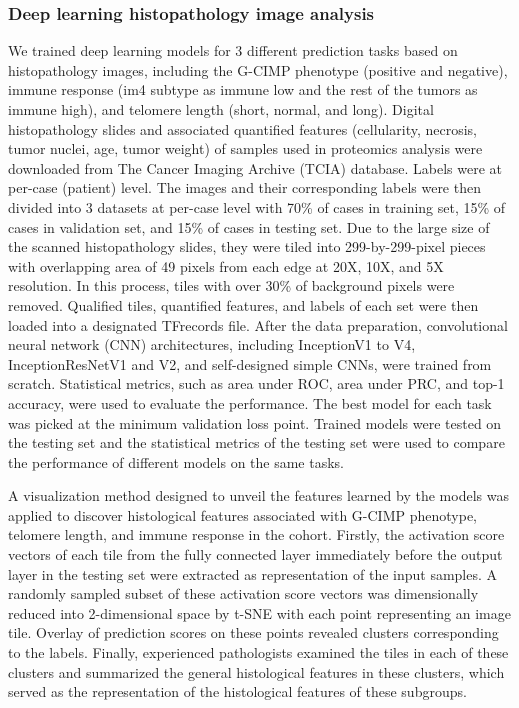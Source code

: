 \subsubsection{Deep learning histopathology image analysis}
We trained deep learning models for 3 different prediction tasks based on histopathology images, including the G-CIMP phenotype (positive and negative), immune response (im4 subtype as immune low and the rest of the tumors as immune high), and telomere length (short, normal, and long). Digital histopathology slides and associated quantified features (cellularity, necrosis, tumor nuclei, age, tumor weight) of samples used in proteomics analysis were downloaded from The Cancer Imaging Archive (TCIA) database. Labels were at per-case (patient) level. The images and their corresponding labels were then divided into 3 datasets at per-case level with 70\% of cases in training set, 15\% of cases in validation set, and 15\% of cases in testing set. Due to the large size of the scanned histopathology slides, they were tiled into 299-by-299-pixel pieces with overlapping area of 49 pixels from each edge at 20X, 10X, and 5X resolution. In this process, tiles with over 30\% of background pixels were removed. Qualified tiles, quantified features, and labels of each set were then loaded into a designated TFrecords file. After the data preparation, convolutional neural network (CNN) architectures, including InceptionV1 to V4, InceptionResNetV1 and V2, and self-designed simple CNNs, were trained from scratch. Statistical metrics, such as area under ROC, area under PRC, and top-1 accuracy, were used to evaluate the performance. The best model for each task was picked at the minimum validation loss point. Trained models were tested on the testing set and the statistical metrics of the testing set were used to compare the performance of different models on the same tasks.

A visualization method designed to unveil the features learned by the models was applied to discover histological features associated with G-CIMP phenotype, telomere length, and immune response in the cohort. Firstly, the activation score vectors of each tile from the fully connected layer immediately before the output layer in the testing set were extracted as representation of the input samples. A randomly sampled subset of these activation score vectors was dimensionally reduced into 2-dimensional space by t-SNE with each point representing an image tile. Overlay of prediction scores on these points revealed clusters corresponding to the labels. Finally, experienced pathologists examined the tiles in each of these clusters and summarized the general histological features in these clusters, which served as the representation of the histological features of these subgroups.

